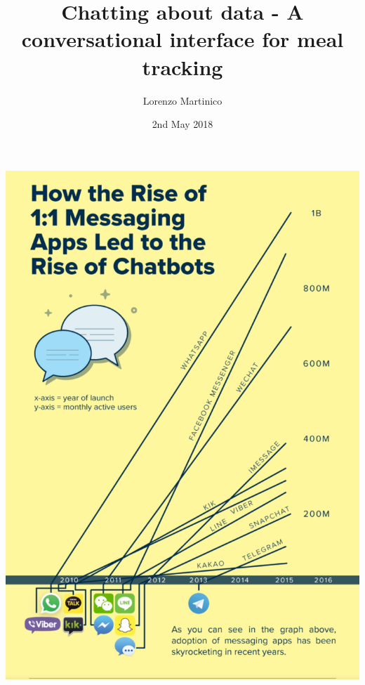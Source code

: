\documentclass[landscape]{infslides}
\begin{document}
\title{Chatting about data - A conversational interface for meal tracking}
\author{Lorenzo Martinico}
\date{2nd May 2018}
\maketitle
\begin{sliderotated}{}
    \centering
    \includegraphics[height=0.95\textheight]{chatbotrise.png}
    \middlefooter{}
    \rightfooter{}
\end{sliderotated}
\end{document}
